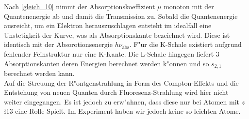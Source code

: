 		Nach \ref{gleich_10} nimmt der Absorptionskoeffizient $\mu$ monoton mit der Quantenenergie ab und damit die Transmission zu.
		Sobald die Quantenenergie ausreicht, um ein Elektron herauszuschlagen entsteht im idealfall eine Unstetigkeit der Kurve, was als Absorptionskante bezeichnet wird.
		Diese ist identisch mit der Absorotionsenergie $h\nu_\mathrm{abs}$.
		F"ur die K-Schale existiert aufgrund fehlender Feinstruktur nur eine K-Kante.
		Die L-Schale hingegen liefert 3 Absorptionskanten deren Energien berechnet werden k"onnen und so $s_{2,1}$ berechnet werden kann.\\
		Auf die Streuung der R"ontgenstrahlung in Form des Compton-Effekts und die Entstehung von neuen Quanten durch Fluoresenz-Strahlung wird hier nicht weiter eingegangen. Es ist jedoch zu erw"ahnen, dass diese nur bei Atomen mit $z$ \l 13 eine Rolle Spielt.
		Im Experiment haben wir jedoch keine so leichten Atome.